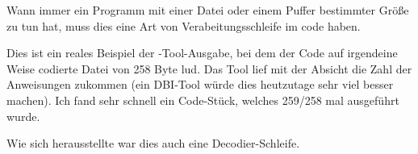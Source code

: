 
Wann immer ein Programm mit einer Datei oder einem Puffer bestimmter Größe
zu tun hat, muss dies eine Art von Verabeitungsschleife im code haben.

Dies ist ein reales Beispiel der \tracer-Tool-Ausgabe, bei dem der Code auf
irgendeine Weise codierte Datei von 258 Byte lud.
Das Tool lief mit der Absicht die Zahl der Anweisungen zukommen
(ein \ac{DBI}-Tool würde dies heutzutage sehr viel besser machen).
Ich fand sehr schnell ein Code-Stück, welches 259/258 mal ausgeführt wurde.



Wie sich herausstellte war dies auch eine Decodier-Schleife.
